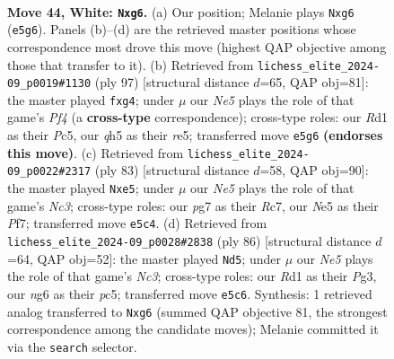 \documentclass[11pt]{article}
\begin{document}
\clearpage

\begin{figure}[p]\centering
\begin{subfigure}{0.46\textwidth}\centering
\resizebox{\linewidth}{!}{%
\newchessgame
\chessboard[
  setfen={2r3k1/6p1/1p4n1/r2pN2q/P3p3/R7/2P2P2/3R2K1 w - - 2 44},
  showmover=false,
  pgfstyle=straightmove, color=movearrow, markmove={e5-g6}
]}
\caption{}
\end{subfigure}\hfill
\begin{subfigure}{0.46\textwidth}\centering
\resizebox{\linewidth}{!}{%
\newchessgame
\chessboard[
  setfen={8/5kp1/r1p5/P1p1Rp2/5PP1/2r4P/R5K1/8 b - - 3 49},
  showmover=false,
  pgfstyle=straightmove, color=movearrow, markmove={f5-g4}
]}
\caption{}
\end{subfigure}
\\[4pt]
\begin{subfigure}{0.46\textwidth}\centering
\resizebox{\linewidth}{!}{%
\newchessgame
\chessboard[
  setfen={3r1k2/2r2p2/p1n2R2/2P1N3/3P3R/1p6/1B6/7K b - - 0 42},
  showmover=false,
  pgfstyle=straightmove, color=movearrow, markmove={c6-e5}
]}
\caption{}
\end{subfigure}\hfill
\begin{subfigure}{0.46\textwidth}\centering
\resizebox{\linewidth}{!}{%
\newchessgame
\chessboard[
  setfen={r5kb/Pr5p/R2p2p1/2p2p2/5K2/2N3P1/8/8 w - - 0 44},
  showmover=false,
  pgfstyle=straightmove, color=movearrow, markmove={c3-d5}
]}
\caption{}
\end{subfigure}
\caption{\textbf{Move 44, White: \texttt{Nxg6}.} (a) Our position; Melanie plays \texttt{Nxg6} (\texttt{e5g6}). Panels (b)--(d) are the retrieved master positions whose correspondence most drove this move (highest QAP objective among those that transfer to it). (b) Retrieved from \texttt{lichess\_elite\_2024-09\_p0019\#1130} (ply 97) [structural distance $d$=65, QAP obj=81]: the master played \texttt{fxg4}; under $\mu$ our \emph{Ne5} plays the role of that game's \emph{Pf4} (a \textbf{cross-type} correspondence); cross-type roles: our \emph{R}d1 as their \emph{P}c5, our \emph{q}h5 as their \emph{r}e5; transferred move \texttt{e5g6} \textbf{(endorses this move)}. (c) Retrieved from \texttt{lichess\_elite\_2024-09\_p0022\#2317} (ply 83) [structural distance $d$=58, QAP obj=90]: the master played \texttt{Nxe5}; under $\mu$ our \emph{Ne5} plays the role of that game's \emph{Nc3}; cross-type roles: our \emph{p}g7 as their \emph{R}c7, our \emph{N}e5 as their \emph{P}f7; transferred move \texttt{e5c4}. (d) Retrieved from \texttt{lichess\_elite\_2024-09\_p0028\#2838} (ply 86) [structural distance $d$=64, QAP obj=52]: the master played \texttt{Nd5}; under $\mu$ our \emph{Ne5} plays the role of that game's \emph{Nc3}; cross-type roles: our \emph{R}d1 as their \emph{P}g3, our \emph{n}g6 as their \emph{p}c5; transferred move \texttt{e5c6}. Synthesis: 1 retrieved analog transferred to \texttt{Nxg6} (summed QAP objective 81, the strongest correspondence among the candidate moves); Melanie committed it via the \texttt{search} selector.}
\label{fig:thought-m86}
\end{figure}
\end{document}
